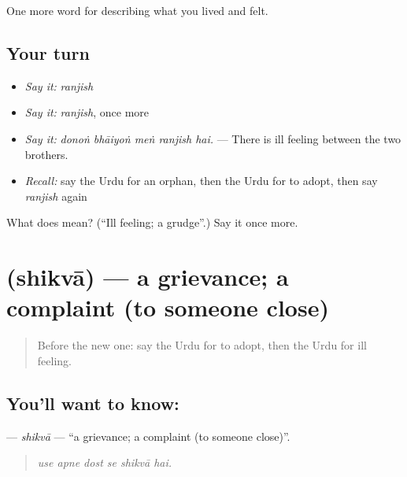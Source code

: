 \begin{grammarlens}[title={What you've built}]
One more word for describing what you lived and felt.
\end{grammarlens}

\subsection*{Your turn}
\begin{itemize}
\raggedright
  \item \emph{Say it:} \emph{ranjish}
  \item \emph{Say it:} \emph{ranjish}, once more
  \item \emph{Say it:} \emph{donoṅ bhāiyoṅ meṅ ranjish hai.} — There is ill feeling between the two brothers.
  \item \emph{Recall:} say the Urdu for an orphan, then the Urdu for to adopt, then say \emph{ranjish} again
\end{itemize}

\begin{tcolorbox}[breakable,colback=teal!4,colframe=teal!35!black,title={Before you move on}]
What does  mean? (\textquotedblleft{}Ill feeling; a grudge\textquotedblright{}.) Say it once more.
\end{tcolorbox}
\section[\texorpdfstring{\ur{شکوہ} (shikvā)}{شکوہ (shikvā)}]{ (shikvā) — a grievance; a complaint (to someone close)}

\label{lesson:UR-C491-shikva}



\begin{quote}
Before the new one: say the Urdu for to adopt, then the Urdu for ill feeling.
\end{quote}

\subsection*{You'll want to know: }
\textbf{} — \emph{shikvā} — \textquotedblleft{}a grievance; a complaint (to someone close)\textquotedblright{}.

\begin{quote}
     
\end{quote}

\begin{quote}
\emph{use apne dost se shikvā hai.}
\end{quote}

